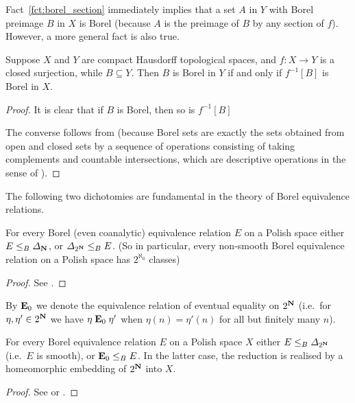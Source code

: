 	Fact~\ref{fct:borel_section} immediately implies that a set $A$ in $Y$ with Borel preimage $B$ in $X$ is Borel (because $A$ is the preimage of $B$ by any section of $f$). However, a more general fact is also true.
	
	\begin{fct}
		\label{fct:borel_preimage}
		Suppose $X$ and $Y$ are compact Hausdorff topological spaces, and $f\colon X\to Y$ is a closed surjection, while $B\subseteq Y$. Then $B$ is Borel in $Y$ if and only if $f^{-1}[B]$ is Borel in $X$.
	\end{fct}
	\begin{proof}
		It is clear that if $B$ is Borel, then so is $f^{-1}[B]$
		
		The converse follows from \cite[Theorem 10]{HS03} (because Borel sets are exactly the sets obtained from open and closed sets by a sequence of operations consisting of taking complements and countable intersections, which are descriptive operations in the sense of \cite{HS03}).
	\end{proof}
	
	
	
	The following two dichotomies are fundamental in the theory of Borel equivalence relations.
	
	\begin{fct}
		\label{fct:silver}
		For every Borel (even coanalytic) equivalence relation $E$ on a Polish space either $E \leq_B \Delta_{{\mathbf{N}}}$, or $\Delta_{2^{{\mathbf{N}}}} \leq_B E$. (So in particular, every non-smooth Borel equivalence relation on a Polish space has $2^{\aleph_0}$ classes)
	\end{fct}
	\begin{proof}
		See \cite[Theorem 10.1.1]{kanovei}.
	\end{proof}
	
	By $\mathrel{ { {\mathbf E}_0 } }$ we denote the equivalence relation of eventual equality on $2^{{\mathbf{N}}}$ (i.e.\ for $\eta,\eta'\in 2^{{\mathbf{N}}}$ we have $\eta\mathrel{ { {\mathbf E}_0 } } \eta'$ when $\eta(n)=\eta'(n)$ for all but finitely many $n$).
	
	\begin{fct}\label{fct:Harrington-Kechris-Louveau dichotomy}
		For every Borel equivalence relation $E$ on a Polish space $X$ either $E \leq_B \Delta_{2^{{\mathbf{N}}}}$ (i.e.\ $E$ is smooth), or ${\mathrel{ { {\mathbf E}_0 } }} \leq_B E$. In the latter case, the reduction is realised by a homeomorphic embedding of $2^{{\mathbf{N}}}$ into $X$.
	\end{fct}
	\begin{proof}
		See \cite[Theorem 1.1]{HKL90} or \cite[Theorem 10.4.1]{kanovei}.
	\end{proof}
	
